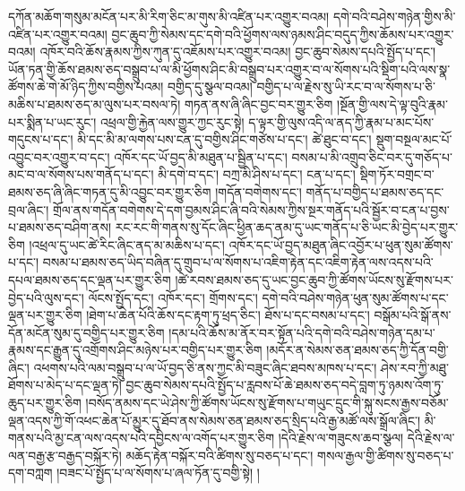 དཀོན་མཆོག་གསུམ་མངོན་པར་མི་རིག་ཅིང་མ་གུས་མི་འཛིན་པར་འགྱུར་བའམ། དགེ་བའི་བཤེས་གཉེན་གྱིས་མི་འཛིན་པར་འགྱུར་བའམ། བྱང་ཆུབ་ཀྱི་སེམས་དང་དགེ་བའི་ཕྱོགས་ལས་ཉམས་ཤིང་བདུད་ཀྱིས་ཆོམས་པར་འགྱུར་བའམ། འཁོར་བའི་ཆོས་རྣམས་ཀྱིས་ཀུན་དུ་འཇོམས་པར་འགྱུར་བའམ། བྱང་ཆུབ་སེམས་དཔའི་སྤྱོད་པ་དང་། ཡོན་ཏན་གྱི་ཆོས་ཐམས་ཅད་བསྒྲུབ་པ་ལ་མི་ཕྱོགས་ཤིང་མི་བསྒྲུབ་པར་འགྱུར་བ་ལ་སོགས་པའི་སྡིག་པའི་ལས་སྣ་ཚོགས་ཆེ་གེ་མོ་ཉིད་ཀྱིས་བགྱིས་པའམ། བགྱིད་དུ་སྩལ་བའམ། བགྱིད་པ་ལ་རྗེས་སུ་ཡི་རང་བ་ལ་སོགས་པ་ཅི་མཆིས་པ་ཐམས་ཅད་མ་ལུས་པར་བསལ་ཏེ། གཏན་ནས་ཞི་ཞིང་བྱང་བར་གྱུར་ཅིག །སྔོན་གྱི་ལས་དེ་ལྟ་བུའི་རྣམ་པར་སྨིན་པ་ཡང་རུང་། འཕྲལ་གྱི་རྐྱེན་ལས་གྱུར་ཀྱང་རུང་སྟེ། ད་ལྟར་གྱི་ལུས་འདི་ལ་ནད་ཀྱི་རྣམ་པ་མང་པོས་གདུངས་པ་དང་། མི་དང་མི་མ་ལགས་པས་ངན་དུ་བགྱིས་ཤིང་གཙེས་པ་དང་། ཚེ་ཐུང་བ་དང་། སྡུག་བསྔལ་མང་པོ་འབྱུང་བར་འགྱུར་བ་དང་། འཁོར་དང་ཡོ་བྱད་མི་མཐུན་པ་སྦྱིན་པ་དང་། བསམ་པ་མི་འགྲུབ་ཅིང་བར་དུ་གཅོད་པ་མང་བ་ལ་སོགས་པས་གནོད་པ་དང་། མི་དགེ་བ་དང་། བཀྲ་མི་ཤིས་པ་དང་། ངན་པ་དང་། སྡིག་ཏོར་བགྲང་བ་ཐམས་ཅད་ཞི་ཞིང་གཏན་དུ་མི་འབྱུང་བར་གྱུར་ཅིག །གདོན་བགེགས་དང་། གནོད་པ་བགྱིད་པ་ཐམས་ཅད་དང་བྲལ་ཞིང་། གྲོལ་ནས་གདོན་བགེགས་དེ་དག་བྱམས་ཤིང་ཞི་བའི་སེམས་ཀྱིས་སྔར་གནོད་པའི་སྦྱོར་བ་ངན་པ་བྱས་པ་ཐམས་ཅད་བཤིག་ནས། རང་རང་གི་གནས་སུ་དོང་ཞིང་ཕྱིན་ཆད་ནམ་དུ་ཡང་གནོད་པ་ཅི་ཡང་མི་བྱེད་པར་གྱུར་ཅིག །འཕྲལ་དུ་ཡང་ཚེ་རིང་ཞིང་ནད་མ་མཆིས་པ་དང་། འཁོར་དང་ཡོ་བྱད་མཐུན་ཞིང་འབྱོར་པ་ཕུན་སུམ་ཚོགས་པ་དང་། བསམ་པ་ཐམས་ཅད་ཡིད་བཞིན་དུ་གྲུབ་པ་ལ་སོགས་པ་འཇིག་རྟེན་དང་འཇིག་རྟེན་ལས་འདས་པའི་དཔལ་ཐམས་ཅད་དང་ལྡན་པར་གྱུར་ཅིག །ཚེ་རབས་ཐམས་ཅད་དུ་ཡང་བྱང་ཆུབ་ཀྱི་ཚོགས་ཡོངས་སུ་རྫོགས་པར་བྱེད་པའི་ལུས་དང་། ལོངས་སྤྱོད་དང་། འཁོར་དང་། གྲོགས་དང་། དགེ་བའི་བཤེས་གཉེན་ཕུན་སུམ་ཚོགས་པ་དང་ལྡན་པར་གྱུར་ཅིག །ཐེག་པ་ཆེན་པོའི་ཆོས་དང་རྟག་ཏུ་ཕྲད་ཅིང་། ཐོས་པ་དང་བསམ་པ་དང་། བསྒོམ་པའི་སྒོ་ནས་དོན་མངོན་སུམ་དུ་བགྱིད་པར་གྱུར་ཅིག །དམ་པའི་ཆོས་མ་ནོར་བར་སྟོན་པའི་དགེ་བའི་བཤེས་གཉེན་དམ་པ་རྣམས་དང་རྒྱུན་དུ་འགྲོགས་ཤིང་མཉེས་པར་བགྱིད་པར་གྱུར་ཅིག །མདོར་ན་སེམས་ཅན་ཐམས་ཅད་ཀྱི་དོན་བགྱི་ཞིང་། འཕགས་པའི་ལམ་བསྒྲུབ་པ་ལ་ཡོ་བྱད་ཅི་ནས་ཀྱང་མི་བཟུང་ཞིང་ཐབས་མཁས་པ་དང་། ཤེས་རབ་ཀྱི་མཐུ་ཐོགས་པ་མེད་པ་དང་ལྡན་ཏེ། བྱང་ཆུབ་སེམས་དཔའི་སྤྱོད་པ་རླབས་པོ་ཆེ་ཐམས་ཅད་བདེ་བླག་ཏུ་ཉམས་འོག་ཏུ་ཆུད་པར་གྱུར་ཅིག །བསོད་ནམས་དང་ཡེ་ཤེས་ཀྱི་ཚོགས་ཡོངས་སུ་རྫོགས་པ་གཡུང་དྲུང་གི་སྐུ་སངས་རྒྱས་བཅོམ་ལྡན་འདས་ཀྱི་གོ་འཕང་ཆེན་པོ་མྱུར་དུ་ཐོབ་ནས་སེམས་ཅན་ཐམས་ཅད་སྲིད་པའི་རྒྱ་མཚོ་ལས་སྒྲོལ་ཞིང་། མི་གནས་པའི་མྱ་ངན་ལས་འདས་པའི་དབྱིངས་ལ་འགོད་པར་གྱུར་ཅིག །དེའི་རྗེས་ལ་གཟུངས་ཆབ་སྩལ། དེའི་རྗེས་ལ་ལན་བརྒྱ་རྩ་བརྒྱད་བསྐོར་ཏེ། མཆོད་རྟེན་བསྐོར་བའི་ཚིགས་སུ་བཅད་པ་དང་། གསལ་རྒྱལ་གྱི་ཚིགས་སུ་བཅད་པ་དག་བཀླག །བཟང་པོ་སྤྱོད་པ་ལ་སོགས་པ་ཞལ་ཏོན་དུ་བགྱི་སྟེ། །
